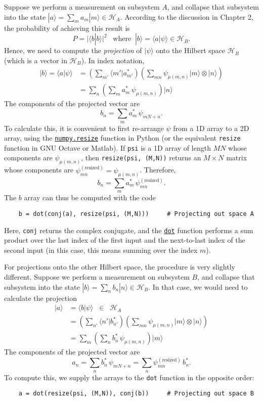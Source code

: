 \documentclass[pra,12pt]{revtex4}
\begin{document}
Suppose we perform a measurement on subsystem $A$, and collapse that
subsystem into the state $|a\rangle = \sum_m a_m |m\rangle \in
\mathscr{H}_A$.  According to the discussion in Chapter 2, the
probability of achieving this result is
$$P = \big|\langle b|b\rangle\big|^2 \;\;\; \mathrm{where} \;\; |b\rangle = \langle a | \psi\rangle \in \mathscr{H}_B.$$
Hence, we need to compute the \textit{projection} of $|\psi\rangle$
onto the Hilbert space $\mathscr{H}_B$ (which is a vector in
$\mathscr{H}_B$).  In index notation,
$$\begin{aligned}|b\rangle = \langle a | \psi\rangle &= \left(\sum_{m'} \langle m'| a_{m'}^* \right) \left(\sum_{mn}\psi_{\mu(m,n)} |m\rangle\otimes|n\rangle \right) \\ &= \sum_{n} \left(\sum_m a_{m}^*\, \psi_{\mu(m,n)}\right) |n\rangle\end{aligned}$$
The components of the projected vector are
$$b_n = \sum_m a_{m}^*\, \psi_{mN+n}.$$
To calculate this, it is convenient to first re-arrange $\psi$ from a
1D array to a 2D array, using the
\href{https://docs.scipy.org/doc/numpy/reference/generated/numpy.resize.html}{\texttt{numpy.resize}}
function in Python (or the equivalent \texttt{resize} function in GNU
Octave or Matlab).  If \texttt{psi} is a 1D array of length $MN$ whose
components are $\psi_{\mu(m,n)}$, then \texttt{resize(psi, (M,N))}
returns an $M\times N$ matrix whose components are
$\psi_{mn}^{(\mathrm{resized})} = \psi_{\mu(m,n)}$.  Therefore,
$$b_n = \sum_m a_{m}^*\, \psi_{mn}^{(\mathrm{resized})}.$$
The $b$ array can thus be computed with the code
\begin{verbatim}
    b = dot(conj(a), resize(psi, (M,N)))     # Projecting out space A
\end{verbatim}
Here, \texttt{conj} returns the complex conjugate, and the
\href{https://docs.scipy.org/doc/numpy/reference/generated/numpy.dot.html}{\texttt{dot}}
function performs a sum product over the last index of the first input
and the next-to-last index of the second input (in this case, this
means summing over the index $m$).

For projections onto the other Hilbert space, the procedure is very
slightly different.  Suppose we perform a measurement on subsystem
$B$, and collapse that subsystem into the state $|b\rangle = \sum_n
b_n |n\rangle \in \mathscr{H}_B$.  In that case, we would need to
calculate the projection
$$\begin{aligned}|a\rangle &= \langle b | \psi\rangle  \;\; \in \;\; \mathscr{H}_A \\ &= 
\left(\sum_{n'} \langle n'| b_{n'}^* \right) \left(\sum_{mn}\psi_{\mu(m,n)} |m\rangle\otimes|n\rangle \right) \\ &= \sum_{m} \left(\sum_n b_{n}^*\, \psi_{\mu(m,n)}\right) |m\rangle
\end{aligned}$$
The components of the projected vector are
$$a_n = \sum_n b_n^* \, \psi_{mN+n} = \sum_n \psi_{mn}^{(\mathrm{resized})}\, b_{n}^*.$$
To compute this, we supply the arrays to the \texttt{dot} function
in the opposite order:
\begin{verbatim}
    a = dot(resize(psi, (M,N)), conj(b))     # Projecting out space B
\end{verbatim}
\end{document}

